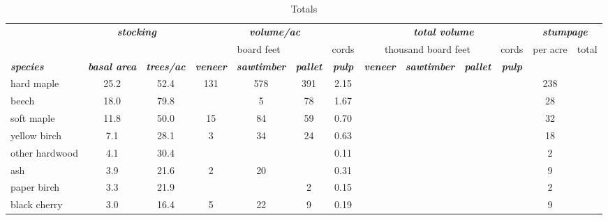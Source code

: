 \documentclass[landscape]{article}
\begin{document}
\begin{table}[H]

\caption{\label{tab:unnamed-chunk-9}Totals}
\fontsize{10}{12}\selectfont
\begin{tabular}[t]{lcccccccccccc}
\toprule
\multicolumn{1}{c}{\em{\textbf{ }}} & \multicolumn{2}{c}{\em{\textbf{stocking}}} & \multicolumn{4}{c}{\em{\textbf{volume/ac }}} & \multicolumn{4}{c}{\em{\textbf{total volume}}} & \multicolumn{2}{c}{\em{\textbf{stumpage}}} \\
\cmidrule(l{3pt}r{3pt}){2-3} \cmidrule(l{3pt}r{3pt}){4-7} \cmidrule(l{3pt}r{3pt}){8-11} \cmidrule(l{3pt}r{3pt}){12-13}
\multicolumn{3}{c}{ } & \multicolumn{3}{c}{board feet} & \multicolumn{1}{c}{cords} & \multicolumn{3}{c}{thousand board feet} & \multicolumn{1}{c}{cords} & \multicolumn{1}{c}{per acre} & \multicolumn{1}{c}{total} \\
\cmidrule(l{3pt}r{3pt}){4-6} \cmidrule(l{3pt}r{3pt}){7-7} \cmidrule(l{3pt}r{3pt}){8-10} \cmidrule(l{3pt}r{3pt}){11-11} \cmidrule(l{3pt}r{3pt}){12-12} \cmidrule(l{3pt}r{3pt}){13-13}
\rowcolor[HTML]{DCDCDC}  \em{\textbf{species}} & \em{\textbf{basal area}} & \em{\textbf{trees/ac}} & \em{\textbf{veneer}} & \em{\textbf{sawtimber}} & \em{\textbf{pallet}} & \em{\textbf{pulp}} & \em{\textbf{veneer}} & \em{\textbf{sawtimber}} & \em{\textbf{pallet}} & \em{\textbf{pulp}} & \em{\textbf{ }} & \em{\textbf{ }}\\
\midrule
\rowcolor{gray!6}  hard maple & 25.2 & 52.4 & 131 & 578 & 391 & 2.15 &  &  &  &  & 238 & \\
 
beech & 18.0 & 79.8 &  & 5 & 78 & 1.67 &  &  &  &  & 28 & \\
 
\rowcolor{gray!6}  soft maple & 11.8 & 50.0 & 15 & 84 & 59 & 0.70 &  &  &  &  & 32 & \\
 
yellow birch & 7.1 & 28.1 & 3 & 34 & 24 & 0.63 &  &  &  &  & 18 & \\
 
\rowcolor{gray!6}  other hardwood & 4.1 & 30.4 &  &  &  & 0.11 &  &  &  &  & 2 & \\
 
ash & 3.9 & 21.6 & 2 & 20 &  & 0.31 &  &  &  &  & 9 & \\
 
\rowcolor{gray!6}  paper birch & 3.3 & 21.9 &  &  & 2 & 0.15 &  &  &  &  & 2 & \\
 
black cherry & 3.0 & 16.4 & 5 & 22 & 9 & 0.19 &  &  &  &  & 9 & \\
 

\end{tabular}
\end{table}
\end{document}
